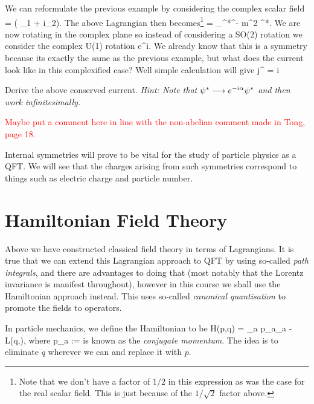 \bex 
    We can reformulate the previous example by considering the complex scalar field
    \bse 
        \psi = \big( \phi_1 + i\phi_2\big).
    \ese 
    The above Lagrangian then becomes\footnote{Note that we don't have a factor of $1/2$ in this expression as was the case for the real scalar field. This is just because of the $1/\sqrt{2}$ factor above.} 
    \be 
    \label{eqn:ComplexLagrangianClassical}
        \cL = \p_{\mu}\psi^*\p^{\mu}\psi - m^2 \psi^*\psi.
    \ee 
    We are now rotating in the complex plane so instead of considering a SO(2) rotation we consider the complex U(1) rotation
    \bse 
        \psi \longrightarrow e^{i\a}\psi.
    \ese 
    We already know that this is a symmetry because its exactly the same as the previous example, but what does the current look like in this complexified case? Well simple calculation will give 
    \be 
    \label{eqn:ComplexCurrent}
        j^{\mu} = i\big[ (\p^{\mu}\psi^*)\psi - \psi^*(\p^{\mu}\psi)\big]
    \ee 
\eex 

\bbox 
    Derive the above conserved current. \textit{Hint: Note that $\psi^* \longrightarrow e^{-i\alpha}\psi^*$ and then work infinitesimally.} 
\ebox 

\br 
    \textcolor{red}{Maybe put a comment here in line with the non-abelian comment made in Tong, page 18.}
\er 

Internal symmetries will prove to be vital for the study of particle physics as a QFT. We will see that the charges arising from such symmetries correspond to things such as electric charge and particle number. 

\section{Hamiltonian Field Theory}

Above we have constructed classical field theory in terms of Lagrangians. It is true that we can extend this Lagrangian approach to QFT by using so-called \textit{path integrals}, and there are advantages to doing that (most notably that the Lorentz invariance is manifest throughout), however in this course we shall use the Hamiltonian approach instead. This uses so-called \textit{canonical quantisation} to promote the fields to operators. 

In particle mechanics, we define the Hamiltonian to be 
\bse 
    H(p,q) = \sum_a p_a_a - L(q,),
\ese
where 
\bse 
    p_a := 
\ese 
is known as the \textit{conjugate momentum}. The idea is to eliminate $\dot{q}$ wherever we can and replace it with $p$. 

